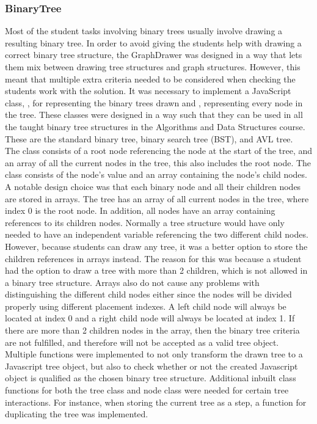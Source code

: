 \subsubsection{BinaryTree}
Most of the student tasks involving binary trees usually involve drawing a resulting binary tree. In order to avoid giving the students help with drawing a correct binary tree structure, the GraphDrawer was designed in a way that lets them mix between drawing tree structures and graph structures. However, this meant that multiple extra criteria needed to be considered when checking the students work with the solution. It was necessary to implement a JavaScript class, , for representing the binary trees drawn and , representing every node in the tree. These classes were designed in a way such that they can be used in all the taught binary tree structures in the Algorithms and Data Structures course. These are the standard binary tree, binary search tree (BST), and AVL tree. 
\\[11pt]
The  class consists of a root node referencing the node at the start of the tree, and an array of all the current nodes in the tree, this also includes the root node. The  class consists of the node's value and an array containing the node's child nodes. A notable design choice was that each binary node and all their children nodes are stored in arrays. The tree has an array of all current nodes in the tree, where index 0 is the root node. In addition, all nodes have an array containing references to its children nodes. Normally a tree structure would have only needed to have an independent variable referencing the two different child nodes. However, because students can draw any tree, it was a better option to store the children references in arrays instead. The reason for this was because a student had the option to draw a tree with more than 2 children, which is not allowed in a binary tree structure. Arrays also do not cause any problems with distinguishing the different child nodes either since the nodes will be divided properly using different placement indexes. A left child node will always be located at index 0 and a right child node will always be located at index 1. If there are more than 2 children nodes in the array, then the binary tree criteria are not fulfilled, and therefore will not be accepted as a valid tree object. Multiple functions were implemented to not only transform the drawn tree to a Javascript tree object, but also to check whether or not the created Javascript object is qualified as the chosen binary tree structure. Additional inbuilt class functions for both the tree class and node class were needed for certain tree interactions. For instance, when storing the current tree as a step, a function for duplicating the tree was implemented.
